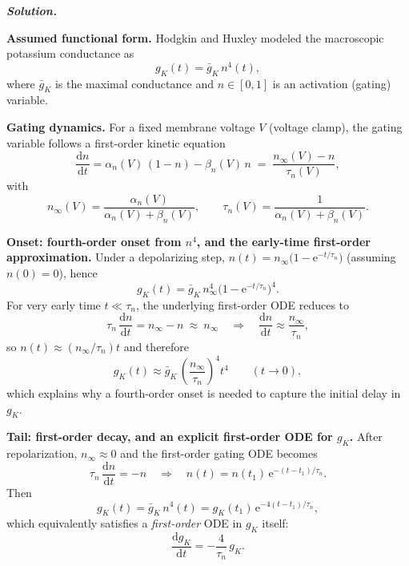 \documentclass{article}
\newif\ifsolutionclearpage
\newenvironment{solution}{%
    \ifsolutionclearpage\clearpage\fi
    \global\solutionclearpagetrue
    \par\noindent\begin{solutionbox}\textbf{\textit{Solution.}}\par\medskip\itshape
}{%
    \end{solutionbox}
}
\renewenvironment{equation}{\begin{equation*}}{\end{equation*}}
\begin{document}
\begin{solution}
\textbf{Assumed functional form.}
Hodgkin and Huxley modeled the macroscopic potassium conductance as
\begin{equation}
g_K(t)=\bar g_K\,n^4(t),
\end{equation}
where $\bar g_K$ is the maximal conductance and $n\in[0,1]$ is an activation (gating) variable.

\textbf{Gating dynamics.}
For a fixed membrane voltage $V$ (voltage clamp), the gating variable follows a first-order kinetic equation
\begin{equation}
\frac{\mathrm{d}n}{\mathrm{d}t}=\alpha_n(V)\,(1-n)-\beta_n(V)\,n
\;=\;\frac{n_\infty(V)-n}{\tau_n(V)},
\end{equation}
with
\begin{equation}
n_\infty(V)=\frac{\alpha_n(V)}{\alpha_n(V)+\beta_n(V)},
\qquad
\tau_n(V)=\frac{1}{\alpha_n(V)+\beta_n(V)}.
\end{equation}

\textbf{Onset: fourth-order onset from $n^4$, and the early-time first-order approximation.}
Under a depolarizing step, $n(t)=n_\infty\bigl(1-\mathrm{e}^{-t/\tau_n}\bigr)$ (assuming $n(0)=0$), hence
\begin{equation}
g_K(t)=\bar g_K\,n_\infty^4\bigl(1-\mathrm{e}^{-t/\tau_n}\bigr)^4.
\end{equation}
For very early time $t\ll \tau_n$, the underlying first-order ODE reduces to
\begin{equation}
\tau_n\,\frac{\mathrm{d}n}{\mathrm{d}t}=n_\infty-n\ \approx\ n_\infty
\quad\Longrightarrow\quad
\frac{\mathrm{d}n}{\mathrm{d}t}\approx \frac{n_\infty}{\tau_n},
\end{equation}
so $n(t)\approx (n_\infty/\tau_n)t$ and therefore
\begin{equation}
g_K(t)\approx \bar g_K\,\left(\frac{n_\infty}{\tau_n}\right)^4 t^4
\qquad (t\to 0),
\end{equation}
which explains why a fourth-order onset is needed to capture the initial delay in $g_K$.

\textbf{Tail: first-order decay, and an explicit first-order ODE for $g_K$.}
After repolarization, $n_\infty\approx 0$ and the first-order gating ODE becomes
\begin{equation}
\tau_n\,\frac{\mathrm{d}n}{\mathrm{d}t}= -n
\quad\Longrightarrow\quad
n(t)=n(t_1)\,\mathrm{e}^{-(t-t_1)/\tau_n}.
\end{equation}
Then
\begin{equation}
g_K(t)=\bar g_K\,n^4(t)=g_K(t_1)\,\mathrm{e}^{-4(t-t_1)/\tau_n},
\end{equation}
which equivalently satisfies a \emph{first-order} ODE in $g_K$ itself:
\begin{equation}
\frac{\mathrm{d}g_K}{\mathrm{d}t}=-\frac{4}{\tau_n}\,g_K.
\end{equation}
\end{solution}
\clearpage
\end{document}
